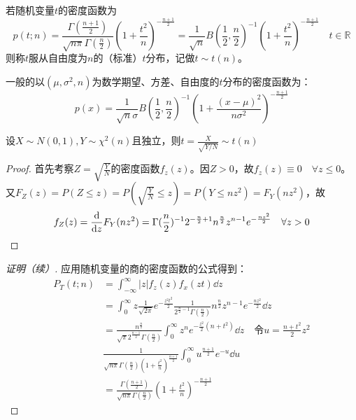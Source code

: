 \documentclass[UTF-8]{ctexbeamer}
\begin{document}
\begin{frame}
  \begin{Def}
    若随机变量$t$的密度函数为
    \[p(t;n)=\frac{\Gamma(\frac{n+1}{2})}{\sqrt{n\pi}\Gamma(\frac{n}{2})}(1+\frac{t^{2}}{n})^{-\frac{n+1}{2}}=\frac{1}{\sqrt{n}}B(\frac{1}{2},\frac{n}{2})^{-1}(1+\frac{t^{2}}{n})^{-\frac{n+1}{2}}\quad t\in\mathbb{R}\]
    则称$t$服从自由度为$n$的（标准）$t$分布，记做$t\sim t(n)$。
  \end{Def}
  一般的以$(\mu,\sigma^{2},n)$为数学期望、方差、自由度的$t$分布的密度函数为：
  \[p(x)=\frac{1}{\sqrt{n}\sigma}B(\frac{1}{2},\frac{n}{2})^{-1}(1+\frac{(x-\mu)^{2}}{n\sigma^{2}})^{-\frac{n+1}{2}}\]
\end{frame}

\begin{frame}
  \begin{Thm}
    设$X\sim N(0,1),Y\sim \chi^{2}(n)$且独立，则$t=\frac{X}{\sqrt{Y/N}}\sim t(n)$
  \end{Thm}
  \begin{proof}
    首先考察$Z=\sqrt{\frac{Y}{N}}$的密度函数$f_{z}(z)$。因$Z>0$，故$f_{z}(z)\equiv 0\quad \forall z\leq 0$。又$F_{Z}(z)=P(Z\leq z)=P(\sqrt{\frac{Y}{N}}\leq z)=P(Y\leq nz^{2})=F_{Y}(nz^{2})$，故
    \[f_{Z}(z)=\frac{\mathrm{d} }{\mathrm{d} z}F_{Y}(nz^{2})=\Gamma(\frac{n}{2})^{-1}2^{-\frac n 2+1}n^{\frac n 2}z^{n-1}e^{-\frac{nz^{2}}{2}}\quad \forall z>0\]
  \end{proof}
\end{frame}

\begin{frame}
  \begin{proof}[证明（续）]
    应用随机变量的商的密度函数的公式得到：
    \begin{equation}
\begin{aligned}
P_{T}(t ; n) &=\int_{-\infty}^{\infty}|z| f_{z}(z) f_{x}(z t) \dd z \\
&=\int_{0}^{\infty} z \frac{1}{\sqrt{2 \pi}} e^{-\frac{z^{2} t^{2}}{2}} \frac{1}{2^{\frac{n}{2}-1} \Gamma\left(\frac{n}{2}\right)} n^{\frac{n}{2}} z^{n-1} e^{-\frac{n z^{2}}{2}} \dd z \\
&=\frac{n ^{\frac{n}{2}}}{\sqrt{\pi} 2^{\frac{n-1}{2}} \Gamma\left(\frac{n}{2}\right)} \int_{0}^{\infty} z^{n} e^{-\frac{z^{2}}{2}\left(n+t^{2}\right)} \dd z \quad \text{令}u=\frac{n+t^{2}}{2}z^{2}\\
& \frac{1}{\sqrt{n \pi} \Gamma\left(\frac{n}{2}\right)\left(1+\frac{t^{2}}{n}\right)^{\frac{n+1}{2}}} \int_{0}^{\infty} u^{ \frac{n+1}{2}}e^{-u} \dd u \\
&=\frac{\Gamma\left(\frac{n+1}{2}\right)}{\sqrt{n \pi} \Gamma\left(\frac{n}{2}\right)}\left(1+\frac{t^{2}}{n}\right)^{-\frac{n+1}{2}}
\end{aligned}
\end{equation}
  \end{proof}
\end{frame}
\end{document}
